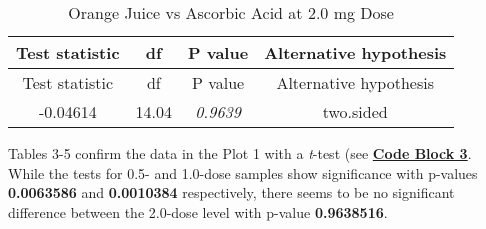 \documentclass[]{article}
\begin{document}
\begin{longtable}[c]{@{}cccc@{}}
\caption{Orange Juice vs Ascorbic Acid at 2.0 mg Dose}\tabularnewline
\toprule
\begin{minipage}[b]{0.21\columnwidth}\centering\strut
Test statistic
\strut\end{minipage} &
\begin{minipage}[b]{0.07\columnwidth}\centering\strut
df
\strut\end{minipage} &
\begin{minipage}[b]{0.12\columnwidth}\centering\strut
P value
\strut\end{minipage} &
\begin{minipage}[b]{0.30\columnwidth}\centering\strut
Alternative hypothesis
\strut\end{minipage}\tabularnewline
\midrule
\endfirsthead
\toprule
\begin{minipage}[b]{0.21\columnwidth}\centering\strut
Test statistic
\strut\end{minipage} &
\begin{minipage}[b]{0.07\columnwidth}\centering\strut
df
\strut\end{minipage} &
\begin{minipage}[b]{0.12\columnwidth}\centering\strut
P value
\strut\end{minipage} &
\begin{minipage}[b]{0.30\columnwidth}\centering\strut
Alternative hypothesis
\strut\end{minipage}\tabularnewline
\midrule
\endhead
\begin{minipage}[t]{0.21\columnwidth}\centering\strut
-0.04614
\strut\end{minipage} &
\begin{minipage}[t]{0.07\columnwidth}\centering\strut
14.04
\strut\end{minipage} &
\begin{minipage}[t]{0.12\columnwidth}\centering\strut
\emph{0.9639}
\strut\end{minipage} &
\begin{minipage}[t]{0.30\columnwidth}\centering\strut
two.sided
\strut\end{minipage}\tabularnewline
\bottomrule
\end{longtable}

Tables 3-5 confirm the data in the Plot 1 with a \emph{t}-test (see
\textbf{\hyperref[code-block-3]{Code Block 3}}. While the tests for 0.5-
and 1.0-dose samples show significance with p-values \textbf{0.0063586}
and \textbf{0.0010384} respectively, there seems to be no significant
difference between the 2.0-dose level with p-value \textbf{0.9638516}.
\end{document}
